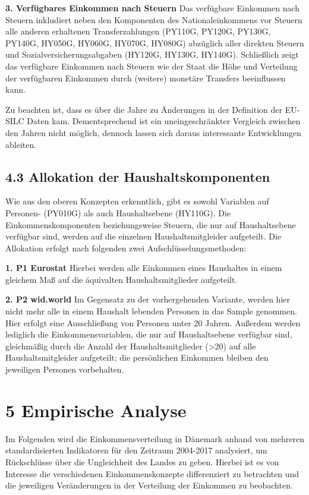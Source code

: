 \documentclass[12pt,]{article}
\begin{document}
\textbf{3. Verfügbares Einkommen nach Steuern} Das verfügbare Einkommen
nach Steuern inkludiert neben den Komponenten des Nationaleinkommens vor
Steuern alle anderen erhaltenen Transferzahlungen (PY110G, PY120G,
PY130G, PY140G, HY050G, HY060G, HY070G, HY080G) abzüglich aller direkten
Steuern und Sozialversicherungsabgaben (HY120G, HY130G, HY140G).
Schließlich zeigt das verfügbare Einkommen nach Steuern wie der Staat
die Höhe und Verteilung der verfügbaren Einkommen durch (weitere)
monetäre Transfers beeinflussen kann.

Zu beachten ist, dass es über die Jahre zu Änderungen in der Definition
der EU-SILC Daten kam. Dementsprechend ist ein uneingeschränkter
Vergleich zwischen den Jahren nicht möglich, dennoch lassen sich daraus
interessante Entwicklungen ableiten.

\subsection{4.3 Allokation der
Haushaltskomponenten}\label{allokation-der-haushaltskomponenten}

Wie aus den oberen Konzepten erkenntlich, gibt es sowohl Variablen auf
Personen- (PY010G) als auch Haushaltsebene (HY110G). Die
Einkommenskomponenten beziehungsweise Steuern, die nur auf
Haushaltsebene verfügbar sind, werden auf die einzelnen
Haushaltsmitgleider aufgeteilt. Die Allokation erfolgt nach folgenden
zwei Aufschlüsselungsmethoden:

\textbf{1. P1 Eurostat } Hierbei werden alle Einkommen eines Haushaltes
in einem gleichem Maß auf die äquivalten Haushaltsmitglieder aufgeteilt.

\textbf{2. P2 wid.world } Im Gegensatz zu der vorhergehenden Variante,
werden hier nicht mehr alle in einem Haushalt lebenden Personen in das
Sample genommen. Hier erfolgt eine Ausschließung von Personen unter 20
Jahren. Außerdem werden lediglich die Einkommensvariablen, die nur auf
Haushaltsebene verfügbar sind, gleichmäßig durch die Anzahl der
Haushaltsmitglieder (\textgreater{}20) auf alle Haushaltsmitgleider
aufgeteilt; die persönlichen Einkommen bleiben den jeweiligen Personen
vorbehalten.

\section{5 Empirische Analyse}\label{empirische-analyse}

Im Folgenden wird die Einkommensverteilung in Dänemark anhand von
mehreren standardisierten Indikatoren für den Zeitraum 2004-2017
analysiert, um Rückschlüsse über die Ungleichheit des Landes zu geben.
Hierbei ist es von Interesse die verschiedenen Einkommenskonzepte
differenziert zu betrachten und die jeweiligen Veränderungen in der
Verteilung der Einkommen zu beobachten.
\end{document}
